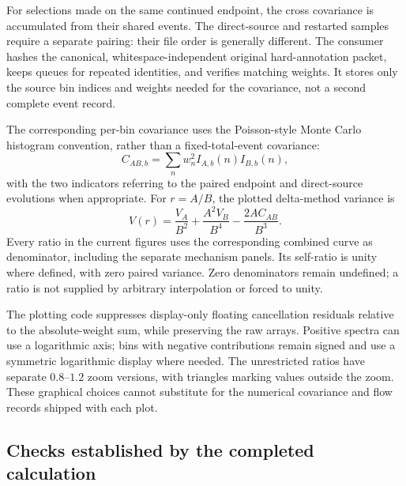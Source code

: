 For selections made on the same continued endpoint, the cross
covariance is accumulated from their shared events.  The direct-source
and restarted samples require a separate pairing: their file order
is generally different.  The consumer hashes the canonical,
whitespace-independent original hard-annotation packet, keeps queues
for repeated identities, and verifies matching weights.  It stores
only the source bin indices and weights needed for the covariance,
not a second complete event record.

The corresponding per-bin covariance uses the Poisson-style Monte Carlo
histogram convention, rather than a fixed-total-event covariance:
\begin{equation}
 C_{AB,b}
 = \sum_n w_n^2 I_{A,b}(n)I_{B,b}(n),
 \label{eq:impl-hist-cov}
\end{equation}
with the two indicators referring to the paired endpoint and
direct-source evolutions when appropriate.  For \(r=A/B\), the
plotted delta-method variance is
\begin{equation}
 V(r)=\frac{V_A}{B^2}
       +\frac{A^2 V_B}{B^4}
       -\frac{2A C_{AB}}{B^3}.
 \label{eq:impl-ratio-var}
\end{equation}
Every ratio in the current figures uses the corresponding combined
\macnlops{} curve as denominator, including the separate mechanism
panels.  Its self-ratio is unity where defined, with zero paired
variance.  Zero denominators remain undefined; a ratio is not supplied
by arbitrary interpolation or forced to unity.

The plotting code suppresses display-only floating cancellation
residuals relative to the absolute-weight sum, while preserving the
raw arrays.  Positive spectra can use a logarithmic axis; bins with
negative contributions remain signed and use a symmetric logarithmic
display where needed.  The unrestricted ratios have separate
\(0.8\)--\(1.2\) zoom versions, with triangles marking values outside
the zoom.  These graphical choices cannot substitute for the numerical
covariance and flow records shipped with each plot.

\subsection{Checks established by the completed calculation}
\label{sec:impl-checks}

